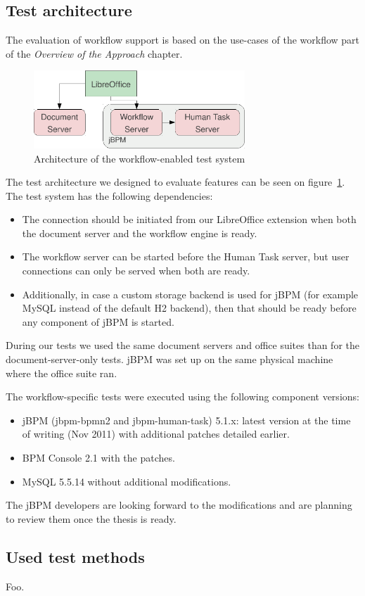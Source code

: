 \subsection*{Test architecture}

The evaluation of workflow support is based on the use-cases of the workflow
part of the \emph{Overview of the Approach} chapter.

\begin{figure}[H]
\centering
\includegraphics[width=300px,keepaspectratio]{test-arch-wf.pdf}
\caption{Architecture of the workflow-enabled test system}
\label{fig:test-arch-wf}
\end{figure}

The test architecture we designed to evaluate features can be seen on
figure~\ref{fig:test-arch-wf}. The test system has the following dependencies:

\begin{itemize}
\item The connection should be initiated from our LibreOffice extension when
both the document server and the workflow engine is ready.
\item The workflow server can be started before the Human Task server, but user
connections can only be served when both are ready.
\item Additionally, in case a custom storage backend is used for jBPM (for
example MySQL instead of the default H2 backend), then that should be ready
before any component of jBPM is started.
\end{itemize}

During our tests we used the same document servers and office suites than for
the document-server-only tests. jBPM was set up on the same physical machine
where the office suite ran.

The workflow-specific tests were executed using the following component versions:

\begin{itemize}
\item jBPM (jbpm-bpmn2 and jbpm-human-task) 5.1.x: latest version at the time
of writing (Nov 2011) with additional patches detailed earlier.
\item BPM Console 2.1 with the patches.
\item MySQL 5.5.14 without additional modifications.
\end{itemize}

The jBPM developers are looking forward to the modifications and are planning
to review them once the thesis is ready.

\subsection*{Used test methods}

Foo.
